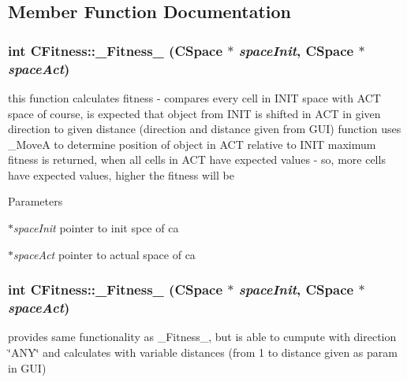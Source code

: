 \subsection{Member Function Documentation}
\hypertarget{classCFitness_ac4244e0b5c5da3831630c7f8d77b80c4}{
\subsubsection[{\_\-Fitness\_\-01}]{\setlength{\rightskip}{0pt plus 5cm}int CFitness::\_\-Fitness\_ ({\bf CSpace} $\ast$ {\em spaceInit}, \/  {\bf CSpace} $\ast$ {\em spaceAct})}}
\label{classCFitness_ac4244e0b5c5da3831630c7f8d77b80c4}
this function calculates fitness -\/ compares every cell in INIT space with ACT space of course, is expected that object from INIT is shifted in ACT in given direction to given distance (direction and distance given from GUI) function uses \_\-MoveA to determine position of object in ACT relative to INIT maximum fitness is returned, when all cells in ACT have expected values -\/ so, more cells have expected values, higher the fitness will be


\begin{DoxyParams}{Parameters}
\item[{\em $\ast$spaceInit}]pointer to init spce of ca \item[{\em $\ast$spaceAct}]pointer to actual space of ca \end{DoxyParams}
\hypertarget{classCFitness_ad6e3f11b3b29abcc1f87b93ae0584777}{
\subsubsection[{\_\-Fitness\_\-02}]{\setlength{\rightskip}{0pt plus 5cm}int CFitness::\_\-Fitness\_ ({\bf CSpace} $\ast$ {\em spaceInit}, \/  {\bf CSpace} $\ast$ {\em spaceAct})}}
\label{classCFitness_ad6e3f11b3b29abcc1f87b93ae0584777}
provides same functionality as \_\-Fitness\_, but is able to cumpute with direction \char`\"{}ANY\char`\"{} and calculates with variable distances (from 1 to distance given as param in GUI)


